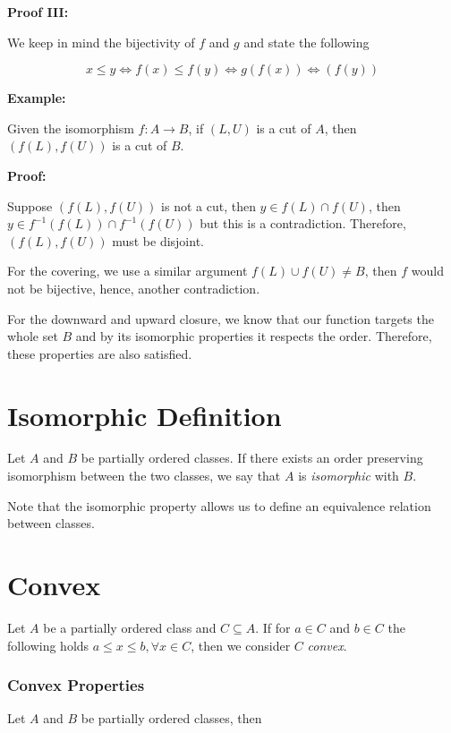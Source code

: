 \QED

\textbf{Proof III:}

We keep in mind the bijectivity of \(f\) and \(g\) and state the following

\[
	x \le y \iff f(x) \le f(y) \iff g(f(x)) \iff (f(y))
\]

\QED

\textbf{Example:}

Given the isomorphism \(f:A \to B\), if \((L,U)\) is a cut of \(A\), then \((f(L), f(U))\) is a cut of \(B\).

\textbf{Proof:}

Suppose \((f(L), f(U))\) is not a cut, then \(y \in f(L) \cap f(U)\), then \(y \in f^{-1}(f(L)) \cap f^{-1}(f(U))\) but this is a contradiction.
Therefore, \((f(L), f(U))\) must be disjoint.

For the covering, we use a similar argument \(f(L) \cup f(U) \neq B\), then \(f\) would not be bijective, hence, another contradiction.

For the downward and upward closure, we know that our function targets the whole set \(B\) and by its isomorphic properties
it respects the order. Therefore, these properties are also satisfied.

\QED

\section{Isomorphic Definition}

Let \(A\) and \(B\) be partially ordered classes. If there exists an order preserving isomorphism between the two
classes, we say that \(A\) is \emph{isomorphic} with \(B\).

Note that the isomorphic property allows us to define an equivalence relation between classes.

\section{Convex}

Let \(A\) be a partially ordered class and \(C \subseteq A\). If for \(a \in C\) and \(b \in C\) the following holds
\(a \le x \le b, \forall x \in C\), then we consider \(C\) \emph{convex}.

\subsubsection{Convex Properties}

Let \(A\) and \(B\) be partially ordered classes, then

